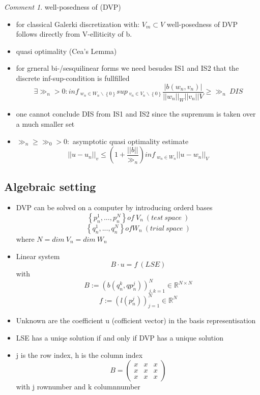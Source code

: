 \documentclass[english]{article}
\theoremstyle{definition}
\theoremstyle{remark}
\newtheorem*{comm}{Comment}
\newcommand{\f}[2]{\frac{#1}{#2}}							%
\newcommand{\RR}{\mathbb{R}}			%
\begin{document}
\newpage
\begin{comm}
  well-posedness of (DVP)
  \begin{itemize}
  \item for classical Galerki discretization with: $V_m\subset V$ well-posedness of DVP follows directly from V-elliticity of b.
  \item quasi optimality (Cea's Lemma)
  \item for grneral bi-/sesquilinear forms we need besudes IS1 and IS2 that the discrete inf-sup-condition is fullfilled\\
    $$\exists \gg_n >0 : inf\ _{w_n \in W_n\backslash \left\{0\right\}} sup\ _{v_n \in V_n\backslash \left\{0\right\}} \f{|b(w_n,v_n)|}{||w_n||_W||v_n||V} \geq \gg_n \ DIS$$
  \item one cannot conclude DIS from IS1 and IS2 since the supremum is taken over a much smaller set 
  \item $\gg_n\geq \gg_0>0:$ asymptotic quasi optimality estimate
    $$||u - u_n||_v \leq (1 + \f{||b||}{\gg_n})inf\ _{w_n \in W_n} ||u-w_n||_V$$
  \end{itemize}
  \subsection{ Algebraic setting}%
  \begin{itemize}
  \item DVP can be solved on a computer by introducing orderd bases\\
    $$\left\{ p_n ^1 ,...,p_n ^N\right\} of\ V_n \ (test\ space\ )$$
    $$\left\{q_n ^1 ,..., q_n ^N \right\} of W_n \ (trial\ space\ )$$
    where $N=dim\ V_n = dim\ W_n$
  \item Linear system 
    $$B\cdot u = f \ (LSE)$$
    with $$B:= (b(q_n ^k,qp_n ^j))^N _{j,k=1} \in \RR^{N\times N}$$
    $$f:= (l(p_n ^j))^N _{j=1} \in \RR^{N}$$
  \item Unknown are the coefficient u (cofficient vector) in the basis representisation 
  \item LSE has a uniqe solution if and only if DVP has a unique solution
  \item j is the row index, h is the column index
    $$B=\left( 
      \begin{array}{ccc}
	x&x&x \\
	x&x&x \\
	x&x&x
      \end{array}\right)
    $$
    with j rownumber and k columnnumber
  \end{itemize}
\end{comm}
\end{document}
